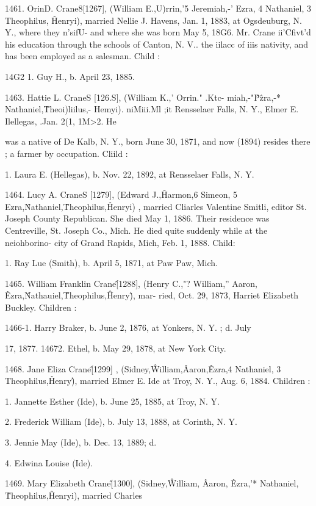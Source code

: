1461. OrinD. Crane8[1267], (William E.,U)rrin,'5 Jeremiah,-' 
Ezra, 4 Nathaniel, 3 Theophilus, \^ Henryi), married Nellie J. 
Havens, Jan. 1, 1883, at Ogsdeuburg, N. Y., where they n'sifU- 
and where she was born May 5, 18G6. Mr. Crane ii'Cfivt'd his 
education through the schools of Canton, N. V.. the iilacc of iiis 
nativity, and has been employed as a salesman. Child : 

14G2 1. Guy H., b. April 23, 1885. 

1463. Hattie L. CraneS [126.S], (William K.,' Orrin." .Ktc- 
miah,-"\^ P\^zra,-* Nathaniel,\^ Theoi)liilus,- Hemyi). niMiii.Ml ;it 
Rensselaer Falls, N. Y., Elmer E. Ilellegas, .Jan. 2(1, 1M>2. He 




was a native of De Kalb, N. Y., born June 30, 1871, and now 
(1894) resides there ; a farmer by occupation. Cliild : 

1. Laura E. (Hellegas), b. Nov. 22, 1892, at Rensselaer Falls, N. Y. 

1464. Lucy A. CraneS [1279], (Edward J.,\^ Harmon,6 
Simeon, 5 Ezra,\^ Nathaniel,\^ Theophilus,\^ Henryi) , married Cliarles 
Valentine Smitli, editor St. Joseph County Republican. She died 
May 1, 1886. Their residence was Centreville, St. Joseph Co., 
Mich. He died quite suddenly while at the neiohborino- city of 
Grand Rapids, Mich, Feb. 1, 1888. Child: 

1. Ray Lue (Smith), b. April 5, 1871, at Paw Paw, Mich. 

1465. William Franklin Crane\^ [1288], (Henry C.,"? 
William,'' Aaron, \^ Ezra,\^ Nathauiel,\^ Theophilus,\^ Henry\^), mar- 
ried, Oct. 29, 1873, Harriet Elizabeth Buckley. Children : 

1466-1. Harry Braker, b. June 2, 1876, at Yonkers, N. Y. ; d. July 

17, 1877. 
14672. Ethel, b. May 29, 1878, at New York City. 

1468. Jane Eliza Crane\^ [1299] , (Sidney,\^ William,\^ Aaron,\^ 
Ezra,4 Nathaniel, 3 Theophilus,\^ Henry\^), married Elmer E. Ide 
at Troy, N. Y., Aug. 6, 1884. Children : 

1. Jannette Esther (Ide), b. June 25, 1885, at Troy, N. Y. 

2. Frederick William (Ide), b. July 13, 1888, at Corinth, N. Y. 

3. Jennie May (Ide), b. Dec. 13, 1889; d. 

4. Edwina Louise (Ide). 

1469. Mary Elizabeth Crane\^ [1300], (Sidney,\^ William, \^ 
Aaron, \^ Ezra,'* Nathaniel, \^ Theophilus,\^ Henryi), married Charles 

